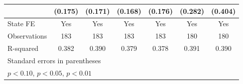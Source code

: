 {\begin{tabular}{l*{6}{c}}
                    &     (0.175)         &     (0.171)         &     (0.168)         &     (0.176)         &     (0.282)         &     (0.404)         \\
\midrule
State FE            &         Yes         &         Yes         &         Yes         &         Yes         &         Yes         &         Yes         \\
Observations        &         183         &         183         &         183         &         183         &         180         &         180         \\
R-squared           &       0.382         &       0.390         &       0.379         &       0.378         &       0.391         &       0.390         \\
\bottomrule
\multicolumn{7}{l}{\footnotesize Standard errors in parentheses}\\
\multicolumn{7}{l}{\footnotesize \sym{*} \(p<0.10\), \sym{**} \(p<0.05\), \sym{***} \(p<0.01\)}\\
\end{tabular}
}
